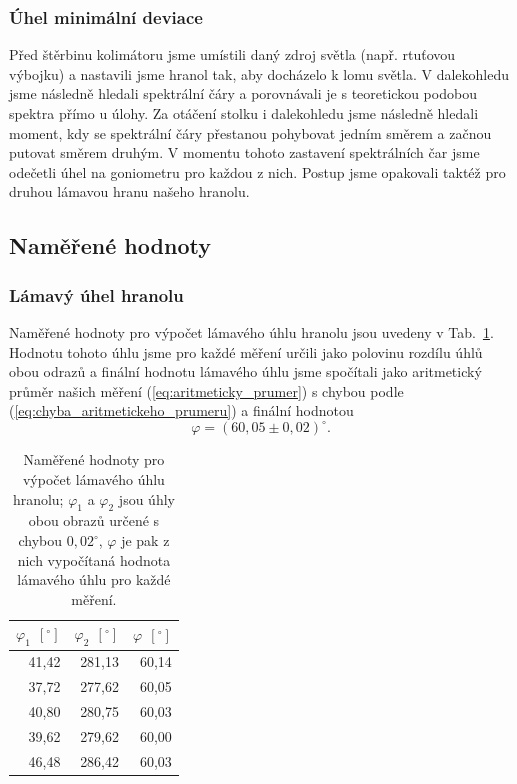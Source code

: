 \documentclass[english]{article}
\newcommand{\unit}[1]{\ \mathrm{#1}}
\begin{document}
		\subsubsection{Úhel minimální deviace}
			Před štěrbinu kolimátoru jsme umístili daný zdroj světla (např. rtuťovou výbojku) a nastavili jsme hranol tak, aby docházelo k lomu světla. V dalekohledu jsme následně hledali spektrální čáry a porovnávali je s teoretickou podobou spektra přímo u úlohy. Za otáčení stolku i dalekohledu jsme následně hledali moment, kdy se spektrální čáry přestanou pohybovat jedním směrem a začnou putovat směrem druhým. V momentu tohoto zastavení spektrálních čar jsme odečetli úhel na goniometru pro každou z nich. Postup jsme opakovali taktéž pro druhou lámavou hranu našeho hranolu. 
		
	\subsection{Naměřené hodnoty}
		\subsubsection{Lámavý úhel hranolu}
			Naměřené hodnoty pro výpočet lámavého úhlu hranolu jsou uvedeny v Tab.~\ref{tab:lamavy_uhel}. Hodnotu tohoto úhlu jsme pro každé měření určili jako polovinu rozdílu úhlů obou odrazů a finální hodnotu lámavého úhlu jsme spočítali jako aritmetický průměr našich měření (\ref{eq:aritmeticky_prumer}) s chybou podle (\ref{eq:chyba_aritmetickeho_prumeru}) a finální hodnotou 
			\begin{equation}
				\varphi = (60,05\pm0,02)^\circ.
			\end{equation}
			
			\begin{table}[htbp]
			  \centering
    \begin{tabular}{|r|r|r|}
    \hline
    \boldmath{}\textbf{$\varphi_1~\unit{[^\circ]}$}\unboldmath{} & \boldmath{}\textbf{$\varphi_2~\unit{[^\circ]}$}\unboldmath{} & \boldmath{}\textbf{$\varphi~\unit{[^\circ]}$}\unboldmath{} \bigstrut\\
    \hline
    41,42 & 281,13 & 60,14 \bigstrut\\
    \hline
    37,72 & 277,62 & 60,05 \bigstrut\\
    \hline
    40,80 & 280,75 & 60,03 \bigstrut\\
    \hline
    39,62 & 279,62 & 60,00 \bigstrut\\
    \hline
    46,48 & 286,42 & 60,03 \bigstrut\\
    \hline
    \end{tabular}%

			    
			      \caption{Naměřené hodnoty pro výpočet lámavého úhlu hranolu; $\varphi_1$ a $\varphi_2$ jsou úhly obou obrazů určené s chybou $0,02^\circ$, $\varphi$ je pak z nich vypočítaná hodnota lámavého úhlu pro každé měření.}
			  \label{tab:lamavy_uhel}%
			\end{table}%
			
\end{document}
